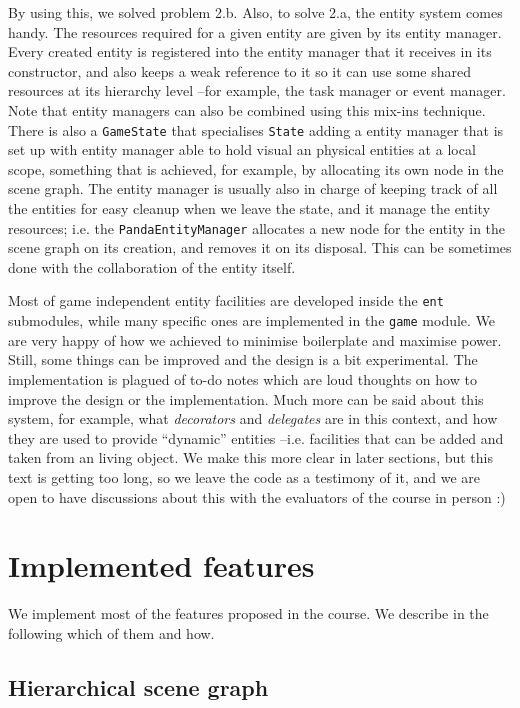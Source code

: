 \documentclass[a4paper,10pt]{article}
\begin{document}
By using this, we solved problem 2.b. Also, to solve 2.a, the entity
system comes handy. The resources required for a given entity are
given by its entity manager. Every created entity is registered into
the entity manager that it receives in its constructor, and also keeps
a weak reference to it so it can use some shared resources at its
hierarchy level --for example, the task manager or event manager. Note that
entity managers can also be combined using this mix-ins
technique. There is also a \texttt{GameState} that specialises
\texttt{State} adding a entity manager that is set up with entity
manager able to hold visual an physical entities at a local scope,
something that is achieved, for example, by allocating its own node in
the scene graph. The entity manager is usually also in charge of
keeping track of all the entities for easy cleanup when we leave the
state, and it manage the entity resources; i.e. the
\texttt{PandaEntityManager} allocates a new node for the entity in the
scene graph on its creation, and removes it on its disposal. This can
be sometimes done with the collaboration of the entity itself.

Most of game independent entity facilities are developed inside the
\texttt{ent} submodules, while many specific ones are implemented in
the \texttt{game} module. We are very happy of how we achieved to
minimise boilerplate and maximise power. Still, some things can be
improved and the design is a bit experimental. The implementation is
plagued of to-do notes which are loud thoughts on how to improve the
design or the implementation. Much more can be said about this system,
for example, what \emph{decorators} and \emph{delegates} are in this
context, and how they are used to provide ``dynamic'' entities
--i.e. facilities that can be added and taken from an living
object. We make this more clear in later sections, but this text is getting too long, so we leave the code as a
testimony of it, and we are open to have discussions about this with
the evaluators of the course in person :)

\section{Implemented features}

We implement most of the features proposed in the course. We describe
in the following which of them and how.

\subsection{Hierarchical scene graph}
\end{document}
